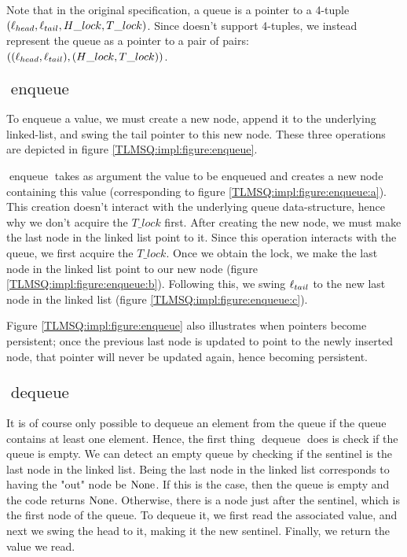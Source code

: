 \documentclass[a4paper, 11pt]{report}
\newcommand{\enqueue}{\operatorname{enqueue}}
\newcommand{\dequeue}{\operatorname{dequeue}}
\begin{document}
Note that in the original specification, a queue is a pointer to a 4-tuple $(\ell_{head}, \ell_{tail}, H\_lock, T\_lock)$. Since \heaplang doesn't support 4-tuples, we instead represent the queue as a pointer to a pair of pairs: $((\ell_{head}, \ell_{tail}), (H\_lock, T\_lock))$.


\subsection[Enqueue]{$\enqueue$}

To enqueue a value, we must create a new node, append it to the underlying linked-list, and swing the tail pointer to this new node. These three operations are depicted in figure \ref{TLMSQ:impl:figure:enqueue}.

$\enqueue$ takes as argument the value to be enqueued and creates a new node containing this value (corresponding to figure \ref{TLMSQ:impl:figure:enqueue:a}). This creation doesn't interact with the underlying queue data-structure, hence why we don't acquire the $T\_lock$ first. After creating the new node, we must make the last node in the linked list point to it. Since this operation interacts with the queue, we first acquire the $T\_lock$. Once we obtain the lock, we make the last node in the linked list point to our new node (figure \ref{TLMSQ:impl:figure:enqueue:b}). Following this, we swing $\ell_{tail}$ to the new last node in the linked list (figure \ref{TLMSQ:impl:figure:enqueue:c}).

Figure \ref{TLMSQ:impl:figure:enqueue} also illustrates when pointers become persistent; once the previous last node is updated to point to the newly inserted node, that pointer will never be updated again, hence becoming persistent.

\subsection[Dequeue]{$\dequeue$}

It is of course only possible to dequeue an element from the queue if the queue contains at least one element. Hence, the first thing $\dequeue$ does is check if the queue is empty. We can detect an empty queue by checking if the sentinel is the last node in the linked list. Being the last node in the linked list corresponds to having the "out" node be $\operatorname{None}$. If this is the case, then the queue is empty and the code returns $\operatorname{None}$. Otherwise, there is a node just after the sentinel, which is the first node of the queue. To dequeue it, we first read the associated value, and next we swing the head to it, making it the new sentinel. Finally, we return the value we read.
\end{document}

